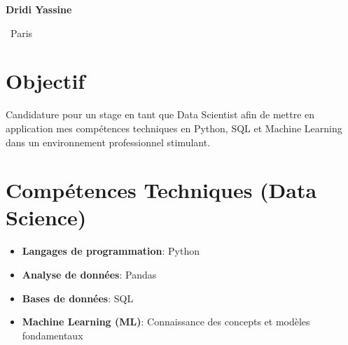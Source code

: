 \documentclass[a4paper,11pt]{article}
\makeatletter
\newcommand{\contactinfo}[1]{%
    \color{graytext}\Info@ \ #1
}
\newcommand{\skillitem}[2]{%
    \textbf{#1}: #2
}
\makeatother
\begin{document}

\begin{center}
    {\Huge\bfseries\color{primary} Dridi Yassine}
    \vspace{10pt}
    
    \contactinfo{Paris}
\end{center}


\section*{Objectif}
Candidature pour un stage en tant que Data Scientist afin de mettre en application mes compétences techniques en Python, SQL et Machine Learning dans un environnement professionnel stimulant.


\section*{Compétences Techniques (Data Science)}

\begin{itemize}[leftmargin=*, label={}, itemsep=4pt, topsep=0pt]
    \item \skillitem{Langages de programmation}{Python}
    \item \skillitem{Analyse de données}{Pandas}
    \item \skillitem{Bases de données}{SQL}
    \item \skillitem{Machine Learning (ML)}{Connaissance des concepts et modèles fondamentaux}
\end{itemize}

\end{document}

